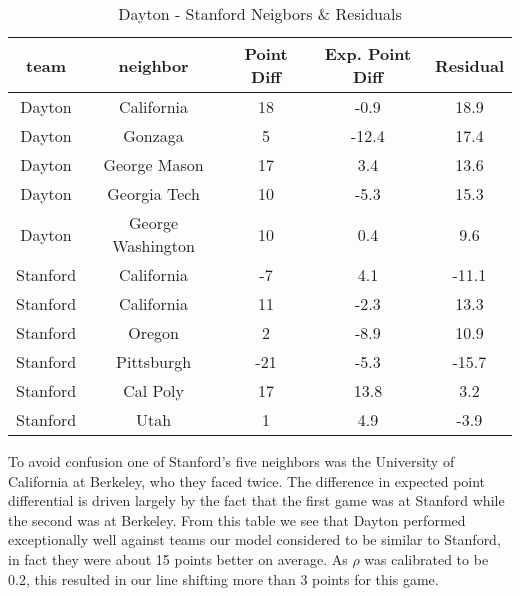 \begin{table}[h!]
\caption{Dayton - Stanford Neigbors \& Residuals}
\small
\centering
\begin{tabular}{|c|cccc |}
   \hline
   \hline
 team & neighbor &  Point Diff& Exp. Point Diff & Residual \\
  \hline
Dayton & California & 18 & -0.9 & 18.9\\
Dayton & Gonzaga & 5 & -12.4 & 17.4\\
Dayton & George Mason& 17 & 3.4 & 13.6\\
Dayton &  Georgia Tech& 10 & -5.3 & 15.3\\
Dayton & George Washington& 10 & 0.4 & 9.6\\
\hline
Stanford & California&-7 & 4.1&-11.1 \\
Stanford & California &11 &-2.3 &13.3 \\
Stanford & Oregon&2 &-8.9 &10.9 \\
Stanford & Pittsburgh&-21 &-5.3 &-15.7 \\
Stanford & Cal Poly&17 &13.8 &3.2 \\
Stanford & Utah&1 &4.9 &-3.9 \\
   \hline
   \hline
\end{tabular}
\label{tab:DayStan}
\end{table}
To avoid confusion one of Stanford's five neighbors was the University of California at Berkeley, who they faced twice.  The difference in expected point differential is driven largely by the fact that the first game was at Stanford while the second was at Berkeley. From this table we see that Dayton performed exceptionally well against teams our model considered to be similar to Stanford, in fact they were about 15 points better on average.  As $\rho$ was calibrated to be 0.2, this resulted in our line shifting more than 3 points for this game.
